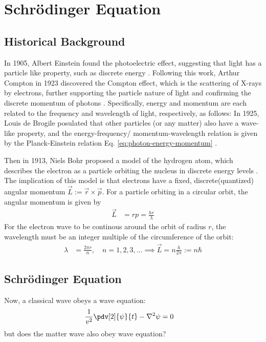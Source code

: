 \section{Schrödinger Equation}
\subsection{Historical Background}
In 1905, Albert Einstein found the photoelectric effect, suggesting that light has a particle like property, such as discrete energy
\cite{1905-photoelectric}.
Following this work, Arthur Compton in 1923 discovered the Compton effect, which is the scattering of X-rays by electrons, further supporting the particle nature of light and confirming the discrete momentum of photons
\cite{1923-compton}.
Specifically, energy and momentum are each related to the frequency and wavelength of light, respectively, as follows:
In 1925, Louis de Brogile posulated that other particles (or any matter) also have a wave-like property, and the energy-frequency/ momentum-wavelength relation is given by the Planck-Einstein relation Eq. \eqref{eq:photon-energy-momentum} \cite{1925-deBroglie}.

Then in 1913, Niels Bohr proposed a model of the hydrogen atom, which describes the electron as a particle orbiting the nucleus in discrete energy levels \cite{1913-bohr}.
The implication of this model is that electrons have a fixed, discrete(quantized) angular momentum $\vec{L} := \vec{r} \times \vec{p}$.
For a particle orbiting in a circular orbit, the angular momentum is given by
\begin{align}
  \vec{L} & = r p = \frac{h r}{\lambda}
\end{align}
For the electron wave to be continous around the orbit of radius $r$, the wavelength must be an integer multiple of the circumference of the orbit:
\begin{align}
  \lambda & = \frac{2 \pi r}{n}, \quad n = 1, 2, 3, \ldots \implies \vec{L} = n \frac{h}{2 \pi} := n \hbar
\end{align}

\subsection{Schrödinger Equation}
Now, a classical wave obeys a wave equation:
\begin{align}
  \frac{1}{v^2} \pdv[2]{\psi}{t} - \nabla^2 \psi & = 0
\end{align}
but does the matter wave also obey wave equation?

